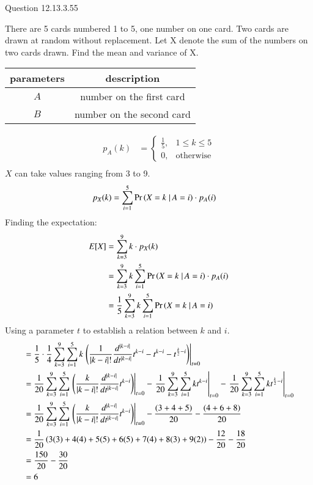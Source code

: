 \documentclass[journal,12pt,onecolumn]{IEEEtran}
\theoremstyle{remark}
\begin{document}
Question 12.13.3.55

There are 5 cards numbered 1 to 5, one number on one card. Two cards are drawn at random without replacement. Let X denote the sum of the numbers on two cards drawn. Find the mean and variance of X.

\solution
\begin{table}[!ht]
\begin{tabular}{|c|c|}
	\hline
	\textbf{parameters} & \textbf{description}\\
	\hline
	$A$ & number on the first card \\
	\hline
	$B$ & number on the second card\\
	\hline
\end{tabular}
\end{table}
\begin{align}
p_A(k) &= 
	\begin{cases}
		\frac{1}{5}, & 1 \leq k \leq 5 \\
		0, & \text{otherwise}
	\end{cases}\\
\end{align}
$X$ can take values ranging from 3 to 9.
\begin{align}
	p_X(k) &= \sum_{i=1}^5\Pr\left(X=k\left. \right |A=i\right)\cdot p_A(i)
\end{align}
Finding the expectation:
\begin{align}
	E[X] &= \sum_{k=3}^9k\cdot p_X(k)\\
	&= \sum_{k=3}^9k\sum_{i=1}^5\Pr\left(X=k\left. \right |A=i\right)\cdot p_A(i)\\
	&= \frac{1}{5}\sum_{k=3}^9k\sum_{i=1}^5\Pr\left(X=k\left. \right |A=i\right)
\end{align}
Using a parameter $t$ to establish a relation between $k$ and $i$.
\begin{align}
	&= \frac{1}{5}\cdot\frac{1}{4}\sum_{k=3}^9\sum_{i=1}^5k\left.\left(\frac{1}{|k-i|!}\frac{d^{|k-i|}}{dt^{|k-i|}}t^{k-i}-t^{k-i}-t^{\frac{k}{2}-i}\right)\right |_{t=0}\\
	&= \frac{1}{20}\sum_{k=3}^9\sum_{i=1}^5\left.\left(\frac{k}{|k-i|!}\frac{d^{|k-i|}}{dt^{|k-i|}}t^{k-i}\right) \right |_{t=0} - \left.\frac{1}{20}\sum_{k=3}^9\sum_{i=1}^5kt^{k-i}\right |_{t=0} - \left.\frac{1}{20}\sum_{k=3}^9\sum_{i=1}^5kt^{\frac{k}{2}-i}\right |_{t=0}\\ \label{eq:12.13.3.55}
	&= \frac{1}{20}\sum_{k=3}^9\sum_{i=1}^5\left.\left(\frac{k}{|k-i|!}\frac{d^{|k-i|}}{dt^{|k-i|}}t^{k-i}\right) \right |_{t=0} - \frac{(3+4+5)}{20} - \frac{(4+6+8)}{20}\\
	&= \frac{1}{20}\left(3(3)+4(4)+5(5)+6(5)+7(4)+8(3)+9(2)\right) - \frac{12}{20} - \frac{18}{20}\\
	&= \frac{150}{20} - \frac{30}{20}\\
	&= 6
\end{align}
\end{document}
